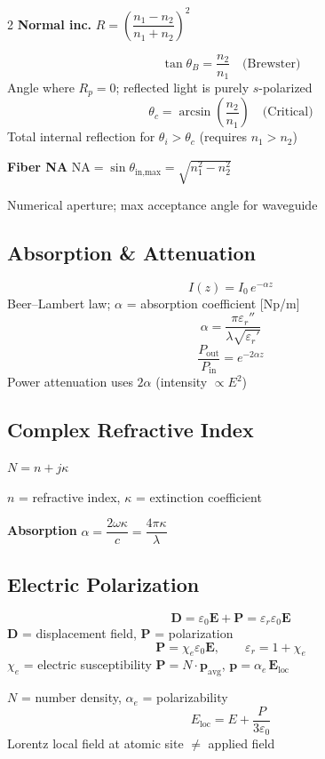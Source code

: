 \documentclass[9pt]{extarticle}
\newcommand{\eqlabel}[1]{\textbf{\scriptsize #1}\;}
\newcommand{\desc}[1]{{\small\color{desc}#1}}
\begin{document}
\begin{multicols}{2}
\eqlabel{Normal inc.} $R = \left(\dfrac{n_1-n_2}{n_1+n_2}\right)^{\!2}$

\[\tan\theta_B = \frac{n_2}{n_1} \quad\text{(Brewster)}\]
\desc{Angle where $R_p = 0$; reflected light is purely $s$-polarized}
\[\theta_c = \arcsin\!\left(\frac{n_2}{n_1}\right) \quad\text{(Critical)}\]
\desc{Total internal reflection for $\theta_i > \theta_c$ (requires $n_1 > n_2$)}

\eqlabel{Fiber NA} $\text{NA} = \sin\theta_{\text{in,max}} = \sqrt{n_1^2 - n_2^2}$

\desc{Numerical aperture; max acceptance angle for waveguide}

\subsection{Absorption \& Attenuation}
\[I(z) = I_0\,e^{-\alpha z}\]
\desc{Beer--Lambert law; $\alpha$ = absorption coefficient [Np/m]}
\[\alpha = \frac{\pi\varepsilon_r''}{\lambda\sqrt{\varepsilon_r'}}\]
\[\frac{P_{\text{out}}}{P_{\text{in}}} = e^{-2\alpha z}\]
\desc{Power attenuation uses $2\alpha$ (intensity $\propto E^2$)}

\subsection{Complex Refractive Index}
$N = n + j\kappa$

\desc{$n$ = refractive index, $\kappa$ = extinction coefficient}

\eqlabel{Absorption} $\alpha = \dfrac{2\omega\kappa}{c} = \dfrac{4\pi\kappa}{\lambda}$


\subsection{Electric Polarization}
\[\mathbf{D} = \varepsilon_0\mathbf{E} + \mathbf{P} = \varepsilon_r\varepsilon_0\mathbf{E}\]
\desc{$\mathbf{D}$ = displacement field, $\mathbf{P}$ = polarization}
\[\mathbf{P} = \chi_e\varepsilon_0\mathbf{E},\qquad \varepsilon_r = 1 + \chi_e\]
\desc{$\chi_e$ = electric susceptibility}
$\mathbf{P} = N\cdot\mathbf{p}_{\text{avg}}$, \quad $\mathbf{p} = \alpha_e\,\mathbf{E}_{\text{loc}}$

\desc{$N$ = number density, $\alpha_e$ = polarizability}
\[E_{\text{loc}} = E + \frac{P}{3\varepsilon_0}\]
\desc{Lorentz local field at atomic site $\neq$ applied field}


\end{multicols}
\end{document}
